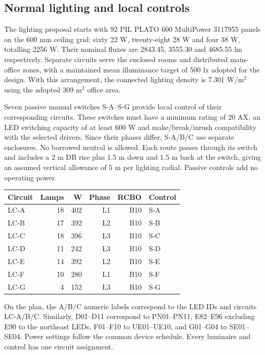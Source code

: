 {\fontsize{12}{14}\selectfont\tenantselection}
\subsection*{Normal lighting and local controls}
The lighting proposal starts with 92 PIL PLATO 600 MultiPower 3117955 panels on the 600 mm ceiling grid: sixty 22 W, twenty-eight 28 W and four 38 W, totalling 2256 W. Their nominal fluxes are 2843.45, 3555.30 and 4685.55 lm respectively. Separate circuits serve the enclosed rooms and distributed main-office zones, with a maintained mean illuminance target of 500 lx adopted for the design. With this arrangement, the connected lighting density is 7.301 W/m$^2$ using the adopted 309 m$^2$ office area.

Seven passive manual switches S-A--S-G provide local control of their corresponding circuits. These switches must have a minimum rating of 20 AX, an LED switching capacity of at least 600 W and make/break/inrush compatibility with the selected drivers. Since their phases differ, S-A/B/C use separate enclosures. No borrowed neutral is allowed. Each route passes through its switch and includes a 2 m DB rise plus 1.5 m down and 1.5 m back at the switch, giving an assumed vertical allowance of 5 m per lighting radial. Passive controls add no operating power.
\begin{center}\begin{tabular}{lrrrrl}\toprule
Circuit & Lamps & W & Phase & RCBO & Control\\\midrule

LC-A & 18 & 402 & L1 & B10 & S-A \\
LC-B & 17 & 392 & L2 & B10 & S-B \\
LC-C & 18 & 396 & L3 & B10 & S-C \\
LC-D & 11 & 242 & L3 & B10 & S-D \\
LC-E & 14 & 392 & L2 & B10 & S-E \\
LC-F & 10 & 280 & L1 & B10 & S-F \\
LC-G & 4 & 152 & L3 & B10 & S-G \\

\bottomrule\end{tabular}\end{center}
On the plan, the A/B/C numeric labels correspond to the LED IDs and circuits LC-A/B/C. Similarly, D01--D11 correspond to PN01--PN11, E82--E96 excluding E90 to the northeast LEDs, F01--F10 to UE01--UE10, and G01--G04 to SE01--SE04. Power settings follow the common device schedule. Every luminaire and control has one circuit assignment.

